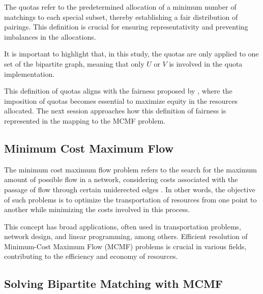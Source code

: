             The quotas refer to the predetermined allocation of a minimum number of matchings to each special subset, thereby establishing a fair distribution of pairings. This definition is crucial for ensuring representativity and preventing imbalances in the allocations.
            
            It is important to highlight that, in this study, the quotas are only applied to one set of the bipartite graph, meaning that only $U$ or $V$ is involved in the quota implementation.
            
            This definition of quotas aligns with the fairness proposed by \cite{sankar}, where the imposition of quotas becomes essential to maximize equity in the resources allocated. The next session approaches how this definition of fairness is represented in the mapping to the MCMF problem. 
            
        \subsection{Minimum Cost Maximum Flow}
            
            The minimum cost maximum flow problem refers to the search for the maximum amount of possible flow in a network, considering costs associated with the passage of flow through certain uniderected edges \cite{korte2018combinatorial, ford1956maximal}. In other words, the objective of such problems is to optimize the transportation of resources from one point to another while minimizing the costs involved in this process.
            
            This concept has broad applications, often used in transportation problems, network design, and linear programming, among others. Efficient resolution of Minimum-Cost Maximum Flow (MCMF) problems is crucial in various fields, contributing to the efficiency and economy of resources.
            
        \subsection{Solving Bipartite Matching with MCMF}\label{subsubsec:resolucao-fluxo-matching}
            
